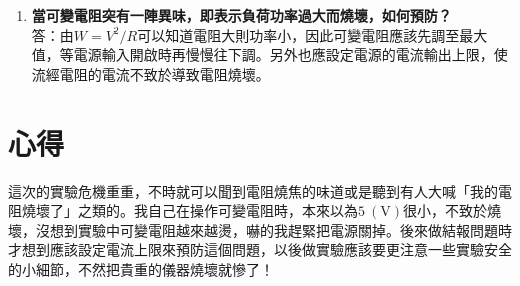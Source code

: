 \documentclass[12pt, a4paper]{article}
\def\large{\fontsize{14}{21}\selectfont}
\newcommand{\unit}[1]{\:(\text{#1})}
\begin{document}
\begin{enumerate}[itemsep=20pt, topsep=10pt]
	\item {\large\bf 當可變電阻突有一陣異味，即表示負荷功率過大而燒壞，如何預防？} \\[10pt]
		答：由$W = V^2 / R$可以知道電阻大則功率小，因此可變電阻應該先調至最大值，等電源輸入開啟時再慢慢往下調。另外也應設定電源的電流輸出上限，使流經電阻的電流不致於導致電阻燒壞。
\end{enumerate}

\section{心得}
這次的實驗危機重重，不時就可以聞到電阻燒焦的味道或是聽到有人大喊「我的電阻燒壞了」之類的。我自己在操作可變電阻時，本來以為$5 \unit{V}$很小，不致於燒壞，沒想到實驗中可變電阻越來越燙，嚇的我趕緊把電源關掉。後來做結報問題時才想到應該設定電流上限來預防這個問題，以後做實驗應該要更注意一些實驗安全的小細節，不然把貴重的儀器燒壞就慘了！
\end{document}
